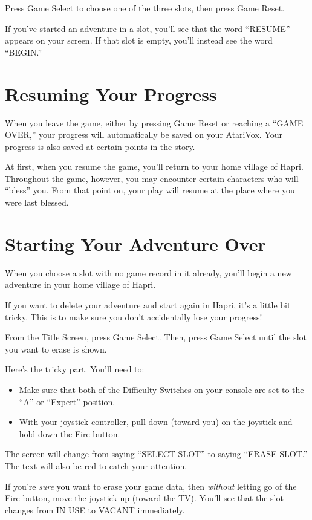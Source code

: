 \documentclass[10pt,twoside,openright]{memoir}
\begin{document}
Press Game Select to choose one of the three slots, then press Game
Reset.

If you've started an adventure in a slot, you'll see that the word
``RESUME'' appears on your screen. If that slot is empty, you'll
instead see the word ``BEGIN.''

\section{Resuming Your Progress}

When you leave the game, either by pressing Game Reset or reaching a
``GAME OVER,'' your progress will automatically be saved on your
AtariVox. Your progress is also saved at certain points in the story.

At first, when you resume the game, you'll return to your home village
of Hapri. Throughout the game, however, you may encounter certain
characters who will ``bless'' you. From that point on, your play will
resume at the place where you were last blessed.

\section{Starting Your Adventure Over}\label{Starting Your Adventure Over}

When you choose a slot with no game record in it already, you'll begin
a new adventure in your home village of Hapri.

If you want to delete your adventure and start again in Hapri, it's a
little bit tricky. This is to make sure you don't accidentally lose
your progress!

From the Title Screen, press Game Select. Then, press Game Select
until the slot you want to erase is shown.

Here's the tricky part. You'll need to:

\begin{itemize}
\item Make sure that both of the Difficulty Switches on your console
  are set to the ``A'' or ``Expert'' position.
\item With your joystick controller, pull down (toward you) on the
  joystick and hold down the Fire button.
\end{itemize}

The screen will change from saying ``SELECT SLOT'' to saying ``ERASE
SLOT.'' The text will also be red to catch your attention.

If  you're  \emph{sure}   you  want  to  erase  your   game  data,  then
\emph{without}  letting go  of the  Fire  button, move  the joystick  up
(toward  the TV).  You'll  see that  the  slot changes  from  IN USE  to
VACANT immediately.
\end{document}
